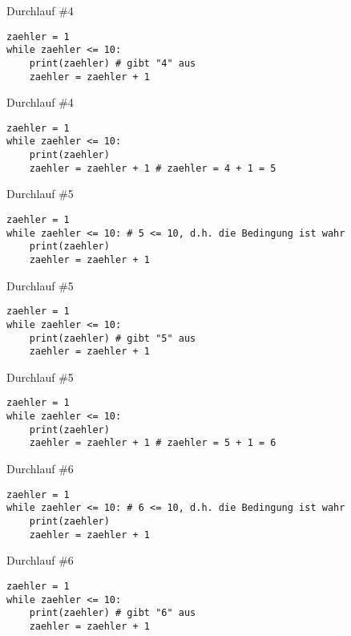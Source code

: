 \documentclass{\VorlagenPfad/coderdojokabeamer}
\begin{document}
\begin{frame}[fragile]{Durchlauf \#4}
	\begin{verbatim}
zaehler = 1
while zaehler <= 10:
	print(zaehler) # gibt "4" aus
	zaehler = zaehler + 1
	\end{verbatim}
\end{frame}


\begin{frame}[fragile]{Durchlauf \#4}
	\begin{verbatim}
zaehler = 1
while zaehler <= 10:
	print(zaehler)
	zaehler = zaehler + 1 # zaehler = 4 + 1 = 5
	\end{verbatim}
\end{frame}


\begin{frame}[fragile]{Durchlauf \#5}
	\begin{verbatim}
zaehler = 1
while zaehler <= 10: # 5 <= 10, d.h. die Bedingung ist wahr
	print(zaehler)
	zaehler = zaehler + 1
	\end{verbatim}
\end{frame}

\begin{frame}[fragile]{Durchlauf \#5}
	\begin{verbatim}
zaehler = 1
while zaehler <= 10:
	print(zaehler) # gibt "5" aus
	zaehler = zaehler + 1
	\end{verbatim}
\end{frame}

\begin{frame}[fragile]{Durchlauf \#5}
	\begin{verbatim}
zaehler = 1
while zaehler <= 10:
	print(zaehler)
	zaehler = zaehler + 1 # zaehler = 5 + 1 = 6
	\end{verbatim}
\end{frame}



\begin{frame}[fragile]{Durchlauf \#6}
	\begin{verbatim}
zaehler = 1
while zaehler <= 10: # 6 <= 10, d.h. die Bedingung ist wahr
	print(zaehler)
	zaehler = zaehler + 1
	\end{verbatim}
\end{frame}

\begin{frame}[fragile]{Durchlauf \#6}
	\begin{verbatim}
zaehler = 1
while zaehler <= 10:
	print(zaehler) # gibt "6" aus
	zaehler = zaehler + 1
\end{verbatim}
\end{frame}
\end{document}
